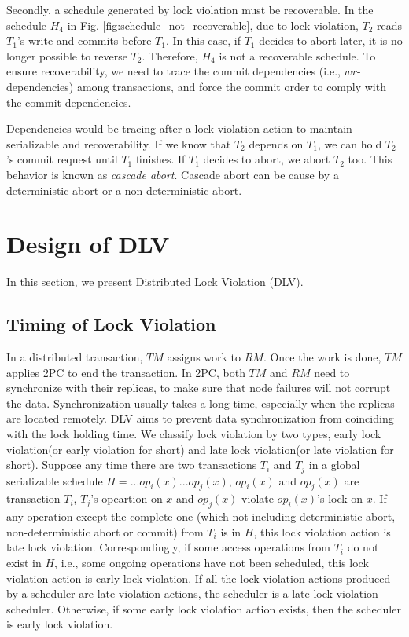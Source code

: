 \documentclass[conference]{IEEEtran}
\begin{document}
Secondly, a schedule generated by lock violation must be recoverable.
In the schedule ${H_4}$ in Fig.   \ref{fig:schedule_not_recoverable}, due to lock violation,
${T_2}$ reads  ${T_1}$'s write and commits before ${T_1}$.
In this case, if ${T_1}$ decides to abort later, it is no longer possible to reverse ${T_2}$.
Therefore, ${H_4}$ is not a recoverable schedule.
To ensure recoverability, we need to trace the commit dependencies (i.e., $wr$-dependencies) among transactions, and force the commit order to comply with the commit dependencies.

Dependencies would be tracing after a lock violation action to maintain serializable and recoverability.
If we know that ${T_2}$ depends on ${T_1}$, we can hold ${T_2}$'s commit request until ${T_1}$ finishes.
If ${T_1}$ decides to abort, we abort ${T_2}$ too. 
This behavior is known as \emph{cascade abort}.
Cascade abort can be cause by a deterministic abort or a non-deterministic abort. 

\section{Design of DLV}
\label{sec:implement}

In this section, we present Distributed Lock Violation (DLV).

\subsection {Timing of Lock Violation}


In a distributed transaction, $TM$ assigns work to $RM$. Once the work is done, $TM$ applies 2PC to end the transaction.
In 2PC, both $TM$ and $RM$ need to synchronize with their replicas, to make sure that node failures will not corrupt the data.
Synchronization usually takes a long time, especially when the replicas are located remotely.
DLV aims to prevent data synchronization from coinciding with the lock holding time.
We classify lock violation by two types, early lock violation(or early violation for short) and late lock violation(or late violation for short).
Suppose any time there are two transactions $T_i$ and $T_j$ in a global serializable schedule $H = ... op_i(x) ... op_j(x)$,
$op_i(x)$ and $op_j(x)$ are transaction $T_i$, $T_j$'s opeartion on $x$
and $op_j(x)$ violate $op_i(x)$'s lock on $x$.
If any operation except the complete one (which not including deterministic abort, non-deterministic abort or commit) from $T_i$ is in $H$,   this lock violation action is late lock violation.
Correspondingly, if some access operations from  $T_i$ do not exist in $H$, i.e., some ongoing operations have not been scheduled, this lock violation action is early lock violation.
If all the lock violation actions produced by a scheduler are late violation actions, the scheduler is a late lock violation scheduler.
Otherwise, if some early lock violation action exists, then the scheduler is early lock violation.
\end{document}
